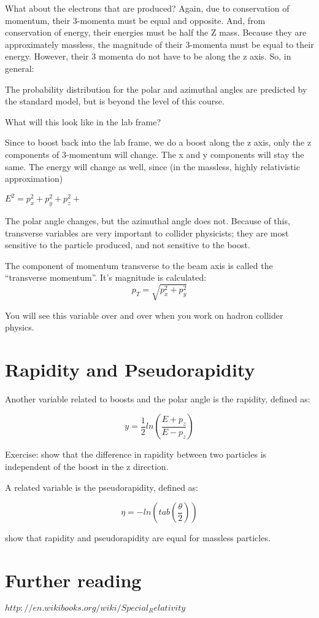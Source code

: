 What about the electrons that are produced?  Again, due to conservation of momentum, their 3-momenta must be equal and opposite.  And, from conservation of energy, their energies must be half the Z mass.  Because they are approximately massless, the magnitude of their 3-momenta must be equal to their energy.  However, their 3 momenta do not have to be along the z axis.  So, in general:
	  
The probability distribution for the polar and azimuthal angles are predicted by the standard model, but is beyond the level of this course.

What will this look like in the lab frame?

Since to boost back into the lab frame, we do a boost along the z axis, only the z components of 3-momentum will change.  The x and y components will stay the same.  The energy will change as well, since (in the massless, highly relativistic approximation)

	$E^2 = p_x^2 + p_y^2 + p_z^2 +$  

The polar angle changes, but the azimuthal angle does not.  Because of this, transverse variables are very important to collider physicists; they are most sensitive to the particle produced, and not sensitive to the boost.

The component of momentum transverse to the beam axis is called the “transverse momentum”.  It’s magnitude is calculated:
\begin{equation}
	 p_T =   \sqrt{p_x^2 +p_y^2}
\end{equation} 
  

You will see this variable over and over when you work on hadron collider physics.

\section{Rapidity and Pseudorapidity}

Another variable related to boosts and the polar angle is the rapidity, defined as:

\begin{equation}
	 y =  \frac{1}{2} ln (\frac{E + p_z}{E-p_z})
\end{equation} 
	  

Exercise: show that the difference in rapidity between two particles is independent of the boost in the z direction.

A related variable is the pseudorapidity, defined as:

\begin{equation}
	 \eta  = - ln (tab (\frac{\theta}{2}))
\end{equation} 


\begin{exercise}
show that rapidity and pseudorapidity are equal for massless particles.
\end{exercise}

\section{Further reading}
	
$http://en.wikibooks.org/wiki/Special_Relativity$

